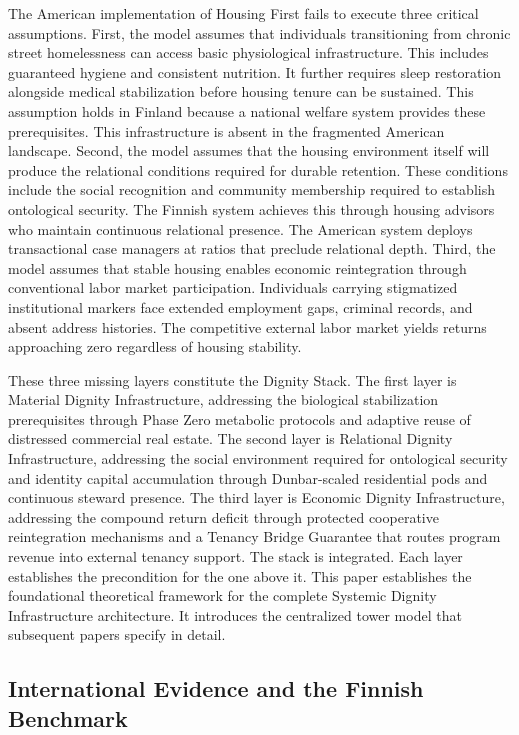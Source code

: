 \documentclass[12pt, letterpaper]{article}
\begin{document}
The American implementation of Housing First fails to execute three critical assumptions. First, the model assumes that individuals transitioning from chronic street homelessness can access basic physiological infrastructure. This includes guaranteed hygiene and consistent nutrition. It further requires sleep restoration alongside medical stabilization before housing tenure can be sustained. This assumption holds in Finland because a national welfare system provides these prerequisites. This infrastructure is absent in the fragmented American landscape. Second, the model assumes that the housing environment itself will produce the relational conditions required for durable retention. These conditions include the social recognition and community membership required to establish ontological security. The Finnish system achieves this through housing advisors who maintain continuous relational presence. The American system deploys transactional case managers at ratios that preclude relational depth. Third, the model assumes that stable housing enables economic reintegration through conventional labor market participation. Individuals carrying stigmatized institutional markers face extended employment gaps, criminal records, and absent address histories. The competitive external labor market yields returns approaching zero regardless of housing stability.

These three missing layers constitute the Dignity Stack. The first layer is Material Dignity Infrastructure, addressing the biological stabilization prerequisites through Phase Zero metabolic protocols and adaptive reuse of distressed commercial real estate. The second layer is Relational Dignity Infrastructure, addressing the social environment required for ontological security and identity capital accumulation through Dunbar-scaled residential pods and continuous steward presence. The third layer is Economic Dignity Infrastructure, addressing the compound return deficit through protected cooperative reintegration mechanisms and a Tenancy Bridge Guarantee that routes program revenue into external tenancy support. The stack is integrated. Each layer establishes the precondition for the one above it. This paper establishes the foundational theoretical framework for the complete Systemic Dignity Infrastructure architecture. It introduces the centralized tower model that subsequent papers specify in detail.

\subsection{International Evidence and the Finnish Benchmark}
\end{document}
